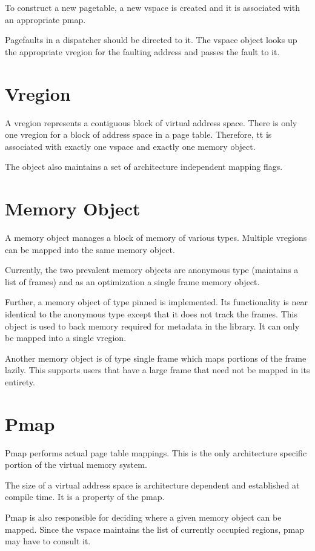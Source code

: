\documentclass[a4paper,twoside]{report} %
\begin{document}
To construct a new pagetable,
a new vspace is created and it is associated with an appropriate pmap.

Pagefaults in a dispatcher should be directed to it.
The vspace object looks up the appropriate vregion for the faulting address and passes the fault to it.

\section{Vregion}
A vregion represents a contiguous block of virtual address space.
There is only one vregion for a block of address space in a page table.
Therefore, tt is associated with exactly one vspace and exactly one memory object.

The object also maintains a set of architecture independent mapping flags.

\section{Memory Object}
A memory object manages a block of memory of various types.
Multiple vregions can be mapped into the same memory object.

Currently, the two prevalent memory objects are anonymous type (maintains a list of frames)
and as an optimization a single frame memory object.

Further, a memory object of type pinned is implemented.
Its functionality is near identical to the anonymous type
except that it does not track the frames.
This object is used to back memory required for metadata in the library.
It can only be mapped into a single vregion.

Another memory object is of type single frame which maps portions of the frame lazily.
This supports users that have a large frame that need not be mapped in its entirety.

\section{Pmap}
Pmap performs actual page table mappings.
This is the only architecture specific portion of the virtual memory system.

The size of a virtual address space is architecture dependent and established at compile time.
It is a property of the pmap.

Pmap is also responsible for deciding where a given memory object can be mapped.
Since the vspace maintains the list of currently occupied regions, pmap may have to consult it.
\end{document}
